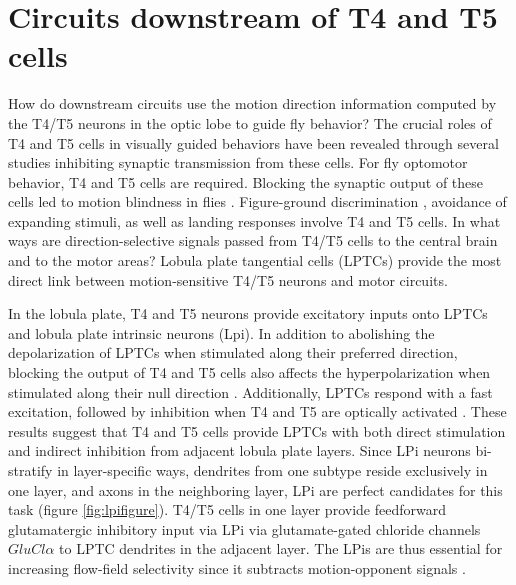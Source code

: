 \section{Circuits downstream of T4 and T5 cells}
How do downstream circuits use the motion direction information computed by the T4/T5 neurons in the optic lobe to guide fly behavior? The crucial roles of T4 and T5 cells in visually guided behaviors have been revealed through several studies inhibiting synaptic transmission from these cells. For fly optomotor behavior, T4 and T5 cells are required. Blocking the synaptic output of these cells led to motion blindness in flies \parencite{Bahl2013}. Figure-ground discrimination \parencite{Fenk2014}, avoidance of expanding stimuli, as well as landing responses \parencite{Schilling2015} involve T4 and T5 cells. In what ways are direction-selective signals passed from T4/T5 cells to the central brain and to the motor areas? Lobula plate tangential cells (LPTCs) provide the most direct link between motion-sensitive T4/T5 neurons and motor circuits. 

In the lobula plate, T4 and T5 neurons provide excitatory inputs onto LPTCs and lobula plate intrinsic neurons (Lpi). In addition to abolishing the depolarization of LPTCs when stimulated along their preferred direction, blocking the output of T4 and T5 cells also affects the hyperpolarization when stimulated along their null direction \parencite{Schnell2012}. Additionally, LPTCs respond with a fast excitation, followed by inhibition when T4 and T5 are optically activated \parencite{Mauss2015}. These results suggest that T4 and T5 cells provide LPTCs with both direct stimulation and indirect inhibition from adjacent lobula plate layers. Since LPi neurons bi-stratify in layer-specific ways, dendrites from one subtype reside exclusively in one layer, and axons in the neighboring layer, LPi are perfect candidates for this task (figure \ref{fig:lpifigure}). T4/T5 cells in one layer provide feedforward glutamatergic inhibitory input via LPi via glutamate-gated chloride channels \textit{$GluCl\alpha$} to LPTC dendrites in the adjacent layer. The LPis are thus essential for increasing flow-field selectivity since it subtracts motion-opponent signals \parencite{Mauss2015}.

